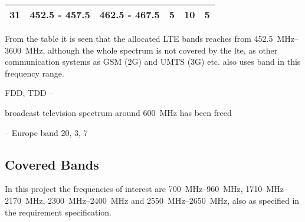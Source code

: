 \begin{table}[]
\begin{tabular}{|c|c|c|c|c|c|}
31                                                          & 452.5 - 457.5                                          & 462.5 - 467.5                                            & 5                                                                    & 10                                                               & 5                                                           \\ \hline
\end{tabular}
\end{table}

From the table it is seen that the allocated LTE bands reaches from \SIrange{452.5}{3600}{MHz}, although the whole spectrum is not covered by the lte, as other communication systems as GSM (2G) and UMTS (3G) etc. also uses band in this frequency range.  

FDD, TDD -- 

broadcast television spectrum around \SI{600}{MHz} has been freed
\cite{Samantha2015tunableAntennas}

 -- Europe band 20, 3, 7 


\subsection{Covered Bands}
In this project the frequencies of interest are \SIrange{700}{960}{MHz}, \SIrange{1710}{2170}{MHz}, \SIrange{2300}{2400}{MHz} and \SIrange{2550}{2650}{MHz}, also as specified in the requirement specification.

